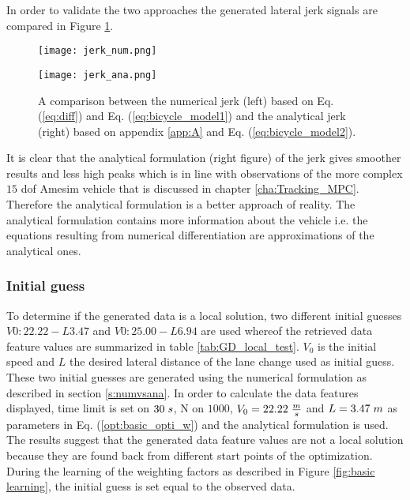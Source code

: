 In order to validate the two approaches the generated lateral jerk signals are compared in Figure \ref{fig:comp_jerks}.

\begin{figure}[h!]
	\centering
	\begin{minipage}{.5\textwidth}
		\centering
		\texttt{[image: jerk\_num.png]}
	\end{minipage}%
	\begin{minipage}{.5\textwidth}
		\centering
		\texttt{[image: jerk\_ana.png]}
	\end{minipage}
	\caption{A comparison between the numerical jerk (left) based on Eq. (\ref{eq:diff}) and Eq. (\ref{eq:bicycle_model1}) and the analytical jerk (right) based on appendix \ref{app:A} and Eq. (\ref{eq:bicycle_model2}). }
	\label{fig:comp_jerks}
\end{figure}

It is clear that the analytical formulation (right figure)  of the jerk gives smoother results and less high peaks which is in line with observations of the more complex $15$ dof Amesim vehicle that is discussed in chapter \ref{cha:Tracking_MPC}. Therefore the analytical formulation is a better approach of reality. The analytical formulation contains more information about the vehicle i.e. the equations resulting from numerical differentiation are approximations of the analytical ones.

\subsubsection{Initial guess}
To determine if the generated data is a local solution, two different initial guesses $V0:22.22 - L3.47$ and $V0:25.00 - L6.94$ are used whereof the retrieved data feature values are summarized in table \ref{tab:GD_local_test}. $V_0$ is the initial speed and $L$ the desired lateral distance of the lane change used as initial guess. These two initial guesses are generated using the numerical formulation as described in section \ref{s:numvsana}. In order to calculate the data features displayed, time limit is set on $30\hspace{1mm}s$, N on $1000$, $V_{0} = 22.22\hspace{1mm}\frac{m}{s}$ and $L = 3.47\hspace{1mm}m$ as parameters in Eq. (\ref{opt:basic_opti_w}) and the analytical formulation is used. The results suggest that the generated data feature values are not a local solution because they are found back from different start points of the optimization. During the learning of the weighting factors as described in Figure \ref{fig:basic learning}, the initial guess is set equal to the observed data. 

